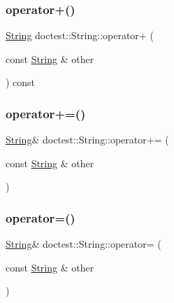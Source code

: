 \mbox{\label{classdoctest_1_1_string_a6ddb6cf1b744a0ae1d4e26b3c8dfa827}} 
\subsubsection{\texorpdfstring{operator+()}{operator+()}}
{\footnotesize\ttfamily \mbox{\hyperlink{classdoctest_1_1_string}{String}} doctest\+::\+String\+::operator+ (\begin{DoxyParamCaption}\item[{const \mbox{\hyperlink{classdoctest_1_1_string}{String}} \&}]{other }\end{DoxyParamCaption}) const}

\mbox{\label{classdoctest_1_1_string_ad1df797f12cd140e3d1739f2b30b64d2}} 
\subsubsection{\texorpdfstring{operator+=()}{operator+=()}}
{\footnotesize\ttfamily \mbox{\hyperlink{classdoctest_1_1_string}{String}}\& doctest\+::\+String\+::operator+= (\begin{DoxyParamCaption}\item[{const \mbox{\hyperlink{classdoctest_1_1_string}{String}} \&}]{other }\end{DoxyParamCaption})}

\mbox{\label{classdoctest_1_1_string_a1979700c536cfe9b5fecc328245f74ca}} 
\subsubsection{\texorpdfstring{operator=()}{operator=()}\hspace{0.1cm}{\footnotesize\ttfamily [1/2]}}
{\footnotesize\ttfamily \mbox{\hyperlink{classdoctest_1_1_string}{String}}\& doctest\+::\+String\+::operator= (\begin{DoxyParamCaption}\item[{const \mbox{\hyperlink{classdoctest_1_1_string}{String}} \&}]{other }\end{DoxyParamCaption})}

